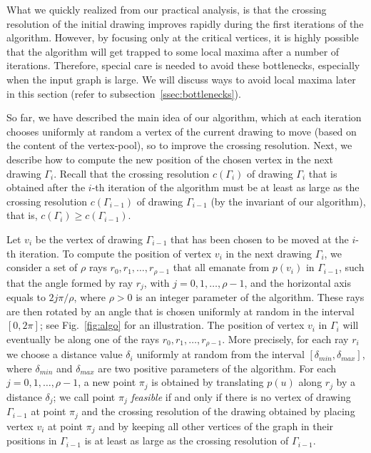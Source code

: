 \documentclass{comjnl}
\begin{document}
What we quickly realized from our practical analysis, is that the crossing resolution of the initial drawing improves rapidly during the first iterations of the algorithm. However, by focusing only at the critical vertices, it is highly possible that the algorithm will get trapped to some local maxima after a number of iterations. Therefore, special care is needed to avoid these bottlenecks, especially when the input graph is large. We will discuss ways to avoid local maxima later in this section (refer to subsection~\ref{ssec:bottlenecks}).

So far, we have described the main idea of our algorithm, which at each iteration chooses uniformly at random a vertex of the current drawing to move (based on the content of the vertex-pool), so to improve the crossing resolution. Next, we describe how to compute the new position of the chosen vertex in the next drawing $\Gamma_i$. Recall that the crossing resolution $c(\Gamma_{i})$ of drawing $\Gamma_{i}$ that is obtained after the $i$-th iteration of the algorithm must be at least as large as the crossing resolution $c(\Gamma_{i-1})$ of drawing $\Gamma_{i-1}$ (by the invariant of our algorithm), that is, $c(\Gamma_i) \ge c(\Gamma_{i-1})$. 

Let $v_i$ be the vertex of drawing $\Gamma_{i-1}$ that has been chosen to be moved at the $i$-th iteration. To compute the position of vertex $v_i$ in the next drawing $\Gamma_i$, we consider a set of $\rho$ rays $r_0,r_1,\ldots,r_{\rho-1}$ that all emanate from $p(v_i)$ in $\Gamma_{i-1}$, such that the angle formed by ray $r_j$, with $j=0,1,\ldots,\rho-1$, and the horizontal axis equals to $2j\pi/\rho$, where $\rho>0$ is an integer parameter of the algorithm. These rays are then rotated by an angle that is chosen uniformly at random in the interval $[0,2\pi]$; see Fig.~\ref{fig:algo} for an illustration. The position of vertex $v_i$ in $\Gamma_i$ will eventually be along one of the rays $r_0,r_1,\ldots,r_{\rho-1}$. More precisely, for each ray $r_i$ we choose a distance value $\delta_i$ uniformly at random from the interval $[\delta_{min},\delta_{max}]$, where $\delta_{min}$ and $\delta_{max}$ are two positive parameters of the algorithm. For each $j=0,1,\ldots,\rho-1$, a new point $\pi_j$ is obtained by translating $p(u)$ along $r_j$ by a distance $\delta_j$; we call point $\pi_j$ \emph{feasible} if and only if there is no vertex of drawing $\Gamma_{i-1}$ at point $\pi_j$ and the crossing resolution of the drawing obtained by placing vertex $v_i$ at point $\pi_j$ and by keeping all other vertices of the graph in their positions in $\Gamma_{i-1}$ is at least as large as the crossing resolution of $\Gamma_{i-1}$.
\end{document}
